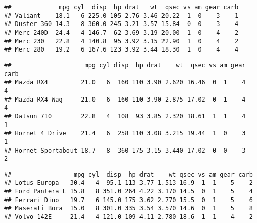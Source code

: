 \documentclass[]{book}
\newenvironment{Shaded}{\begin{snugshade}}{\end{snugshade}}
\newcommand{\DecValTok}[1]{\textcolor[rgb]{0.00,0.00,0.81}{#1}}
\newcommand{\KeywordTok}[1]{\textcolor[rgb]{0.13,0.29,0.53}{\textbf{#1}}}
\newcommand{\NormalTok}[1]{#1}
\newcommand{\OperatorTok}[1]{\textcolor[rgb]{0.81,0.36,0.00}{\textbf{#1}}}
\newcommand{\StringTok}[1]{\textcolor[rgb]{0.31,0.60,0.02}{#1}}
\begin{document}
\begin{Shaded}
\end{Shaded}

\begin{verbatim}
##             mpg cyl  disp  hp drat   wt  qsec vs am gear carb
## Valiant    18.1   6 225.0 105 2.76 3.46 20.22  1  0    3    1
## Duster 360 14.3   8 360.0 245 3.21 3.57 15.84  0  0    3    4
## Merc 240D  24.4   4 146.7  62 3.69 3.19 20.00  1  0    4    2
## Merc 230   22.8   4 140.8  95 3.92 3.15 22.90  1  0    4    2
## Merc 280   19.2   6 167.6 123 3.92 3.44 18.30  1  0    4    4
\end{verbatim}

\begin{Shaded}
\end{Shaded}

\begin{verbatim}
##                    mpg cyl disp  hp drat    wt  qsec vs am gear carb
## Mazda RX4         21.0   6  160 110 3.90 2.620 16.46  0  1    4    4
## Mazda RX4 Wag     21.0   6  160 110 3.90 2.875 17.02  0  1    4    4
## Datsun 710        22.8   4  108  93 3.85 2.320 18.61  1  1    4    1
## Hornet 4 Drive    21.4   6  258 110 3.08 3.215 19.44  1  0    3    1
## Hornet Sportabout 18.7   8  360 175 3.15 3.440 17.02  0  0    3    2
\end{verbatim}

\begin{Shaded}
\end{Shaded}

\begin{verbatim}
##                 mpg cyl  disp  hp drat    wt qsec vs am gear carb
## Lotus Europa   30.4   4  95.1 113 3.77 1.513 16.9  1  1    5    2
## Ford Pantera L 15.8   8 351.0 264 4.22 3.170 14.5  0  1    5    4
## Ferrari Dino   19.7   6 145.0 175 3.62 2.770 15.5  0  1    5    6
## Maserati Bora  15.0   8 301.0 335 3.54 3.570 14.6  0  1    5    8
## Volvo 142E     21.4   4 121.0 109 4.11 2.780 18.6  1  1    4    2
\end{verbatim}
\end{document}
